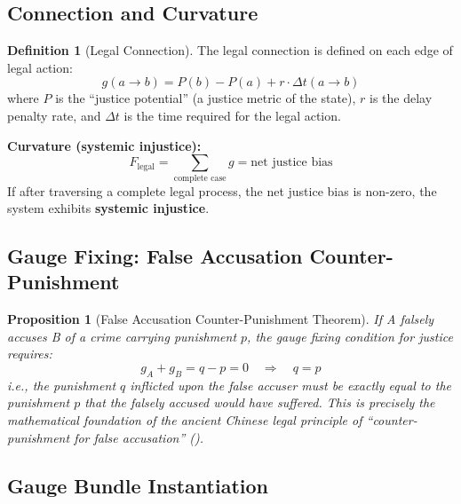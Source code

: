 \documentclass[12pt,a4paper]{article}
\theoremstyle{plain}
\newtheorem{proposition}[theorem]{Proposition}
\theoremstyle{definition}
\newtheorem{definition}[theorem]{Definition}
\begin{document}
\subsection{Connection and Curvature}

\begin{definition}[Legal Connection]
The legal connection is defined on each edge of legal action:
\begin{equation}
    g(a \to b) = P(b) - P(a) + r \cdot \Delta t(a \to b)
\end{equation}
where $P$ is the ``justice potential'' (a justice metric of the state), $r$ is the delay penalty rate,
and $\Delta t$ is the time required for the legal action.

\textbf{Curvature (systemic injustice):}
\begin{equation}
    F_{\text{legal}} = \sum_{\text{complete case}} g = \text{net justice bias}
\end{equation}
If after traversing a complete legal process, the net justice bias is non-zero, the system exhibits \textbf{systemic injustice}.
\end{definition}

\subsection{Gauge Fixing: False Accusation Counter-Punishment}

\begin{proposition}[False Accusation Counter-Punishment Theorem]
If A falsely accuses B of a crime carrying punishment $p$, the gauge fixing condition for justice requires:
\begin{equation}
    g_A + g_B = q - p = 0 \quad \Longrightarrow \quad q = p
\end{equation}
i.e., the punishment $q$ inflicted upon the false accuser must be exactly equal to the punishment $p$ that the falsely accused would have suffered.
This is precisely the mathematical foundation of the ancient Chinese legal principle of ``counter-punishment for false accusation'' ().
\end{proposition}

\subsection{Gauge Bundle Instantiation}
\end{document}
